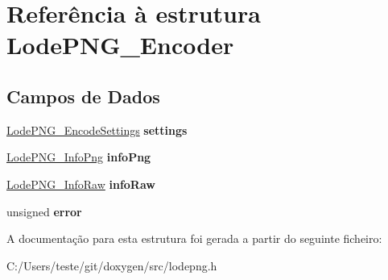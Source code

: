 \hypertarget{struct_lode_p_n_g___encoder}{\section{Referência à estrutura Lode\-P\-N\-G\-\_\-\-Encoder}
\label{struct_lode_p_n_g___encoder}
}
\subsection*{Campos de Dados}
\begin{DoxyCompactItemize}
\item 
\hypertarget{struct_lode_p_n_g___encoder_af8f1ce07b4e2fba9a520ffad1aa5c3cc}{\hyperlink{struct_lode_p_n_g___encode_settings}{Lode\-P\-N\-G\-\_\-\-Encode\-Settings} {\bfseries settings}}\label{struct_lode_p_n_g___encoder_af8f1ce07b4e2fba9a520ffad1aa5c3cc}

\item 
\hypertarget{struct_lode_p_n_g___encoder_a43c2a19c1eff7edb91e2f1606f17c641}{\hyperlink{struct_lode_p_n_g___info_png}{Lode\-P\-N\-G\-\_\-\-Info\-Png} {\bfseries info\-Png}}\label{struct_lode_p_n_g___encoder_a43c2a19c1eff7edb91e2f1606f17c641}

\item 
\hypertarget{struct_lode_p_n_g___encoder_ab77dba1a2759d0020eef88b5bc8b9b2b}{\hyperlink{struct_lode_p_n_g___info_raw}{Lode\-P\-N\-G\-\_\-\-Info\-Raw} {\bfseries info\-Raw}}\label{struct_lode_p_n_g___encoder_ab77dba1a2759d0020eef88b5bc8b9b2b}

\item 
\hypertarget{struct_lode_p_n_g___encoder_aa25790aaf38769a83aeb3bf66ba2adc3}{unsigned {\bfseries error}}\label{struct_lode_p_n_g___encoder_aa25790aaf38769a83aeb3bf66ba2adc3}

\end{DoxyCompactItemize}


A documentação para esta estrutura foi gerada a partir do seguinte ficheiro\-:\begin{DoxyCompactItemize}
\item 
C\-:/\-Users/teste/git/doxygen/src/lodepng.\-h\end{DoxyCompactItemize}

